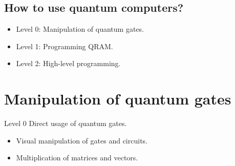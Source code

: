 \documentclass{beamer}
\begin{document}
\subsection{How to use quantum computers?}

\begin{frame}{\insertsection}{\insertsubsection}

  \begin{itemize}
    \item<1-> Level 0: Manipulation of quantum gates.

    \item<2-> Level 1: Programming QRAM. 

    \item<3-> Level 2: High-level programming. 
  \end{itemize}
\end{frame}

\section{Manipulation of quantum gates}

\begin{frame}
    \begin{center}
        {\color{iitis-orange} \LARGE \insertsection}
    \end{center}
\end{frame}

\begin{frame}{\insertsection}{\insertsubsection}
\begin{block}{Level 0}
    Direct usage of quantum gates.
\end{block}
\begin{itemize}
    \item Visual manipulation of gates and circuits.
    \item Multiplication of matrices and vectors.
\end{itemize}
\end{frame}
\end{document}
